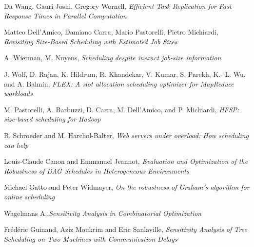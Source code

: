 \documentclass[10pt, conference, compsocconf]{IEEEtran}
\begin{document}
%
%
%
   \begin{thebibliography}{1}


Da Wang, Gauri Joshi, Gregory Wornell, \emph{ Efficient Task Replication for Fast Response Times in Parallel Computation}



Matteo Dell’Amico, Damiano Carra, Mario Pastorelli, Pietro Michiardi, \emph{ Revisiting Size-Based Scheduling
with Estimated Job Sizes}

A. Wierman, M. Nuyens, \emph{ Scheduling despite inexact job-size
information}

J. Wolf, D. Rajan, K. Hildrum, R. Khandekar, V. Kumar, S. Parekh, K.-
L. Wu, and A. Balmin, \emph{FLEX: A slot allocation scheduling optimizer
for MapReduce workloads}

M. Pastorelli, A. Barbuzzi, D. Carra, M. Dell’Amico, and P. Michiardi, \emph{HFSP: size-based scheduling for Hadoop}

B. Schroeder and M. Harchol-Balter, \emph{Web servers under overload: How
scheduling can help}

Louis-Claude Canon and Emmanuel Jeannot,
\emph{Evaluation and Optimization of the Robustness of
DAG Schedules in Heterogeneous Environments}

Michael Gatto and  Peter Widmayer,
\emph{On the robustness of Graham’s algorithm for
online scheduling}

Wagelmans A.,\emph{Sensitivity Analysis in Combinatorial Optimization}

Frédéric Guinand, Aziz Moukrim and Eric Sanlaville, \emph{Sensitivity Analysis of Tree Scheduling on Two Machines with Communication Delays}



\end{thebibliography}

\end{document}
